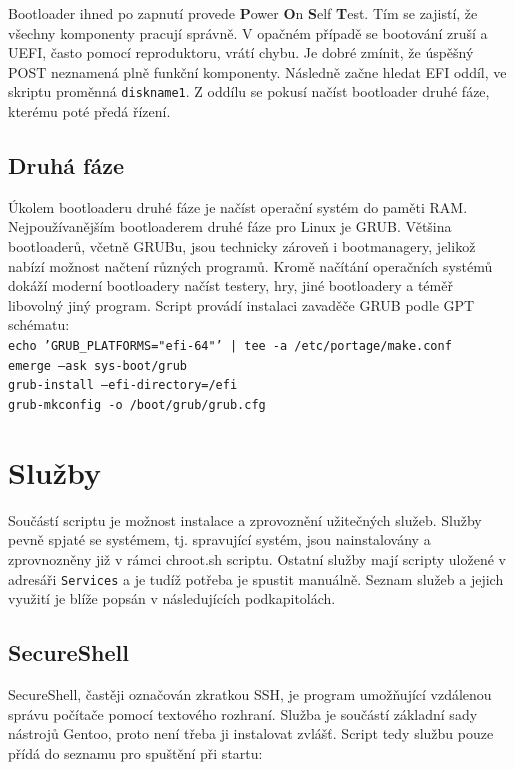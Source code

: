 \documentclass[12pt,a4paper,twoside,]{article}
\begin{document}
{{{{{{\hspace{-1.5em}Bootloader ihned po zapnutí provede {\bf P}ower {\bf O}n {\bf S}elf {\bf T}est. Tím se zajistí, že všechny komponenty pracují správně. V opačném případě se bootování zruší a UEFI, často pomocí reproduktoru, vrátí chybu. Je dobré zmínit, že úspěšný POST neznamená plně funkční komponenty. Následně začne hledat EFI oddíl, ve skriptu proměnná \texttt{diskname1}. Z oddílu se pokusí načíst bootloader druhé fáze, kterému poté předá řízení.

\subsection{\textsf{Druhá fáze}}
Úkolem bootloaderu druhé fáze je načíst operační systém do paměti RAM. Nejpoužívanějším bootloaderem druhé fáze pro Linux je GRUB. Většina bootloaderů, včetně GRUBu, jsou technicky zároveň i bootmanagery, jelikož nabízí možnost načtení různých programů. Kromě načítání operačních systémů dokáží moderní bootloadery načíst testery, hry, jiné bootloadery a téměř libovolný jiný program. Script provádí instalaci zavaděče GRUB podle GPT schématu:\\

\texttt{echo 'GRUB\_PLATFORMS="efi-64"' | tee -a /etc/portage/make.conf}\\
\hspace*{1.5em}\texttt{emerge --ask sys-boot/grub}\\
\hspace*{1.5em}\texttt{grub-install --efi-directory=/efi}\\
\hspace*{1.5em}\texttt{grub-mkconfig -o /boot/grub/grub.cfg}\\

\newpage
\section{\textsf{Služby}}
Součástí scriptu je možnost instalace a zprovoznění užitečných služeb. Služby pevně spjaté se systémem, tj. spravující systém, jsou nainstalovány a zprovnozněny již v rámci chroot.sh scriptu. Ostatní služby mají scripty uložené v adresáři \texttt{Services} a je tudíž potřeba je spustit manuálně. Seznam služeb a jejich využití je blíže popsán v následujících podkapitolách. 

\subsection{\textsf{SecureShell}}
SecureShell, častěji označován zkratkou SSH, je program umožňující vzdálenou správu počítače pomocí textového rozhraní. Služba je součástí základní sady nástrojů Gentoo, proto není třeba ji instalovat zvlášť. Script tedy službu pouze přídá do seznamu pro spuštění při startu: 

}}}}}}
\end{document}
